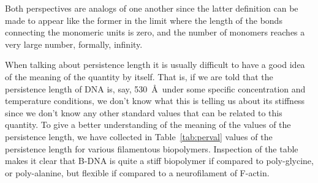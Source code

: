 Both  perspectives  are  analogs  of  one  another  since  the  latter
definition can  be made to appear  like the former in  the limit where
the length  of the bonds connecting  the monomeric units  is zero, and
the  number  of  monomers  reaches  a  very  large  number,  formally,
infinity.

When talking about persistence length  it is usually difficult to have
a good idea of the meaning of  the quantity by itself.  That is, if we
are told that the persistence length of DNA is, say, 530~\AA ~under
some specific concentration and  temperature conditions, we don't know
what this  is telling us about  its stiffness since we  don't know any
other standard values that can be related to this quantity.  To give a
better understanding of  the meaning of the values  of the persistence
length,  we have  collected  in Table~\ref{tab:perval}  values of  the
persistence length for various filamentous biopolymers.  Inspection of
the table  makes it clear  that B-DNA is  quite a stiff  biopolymer if
compared to poly-glycine, or poly-alanine, but flexible if compared to
a neurofilament of F-actin.

